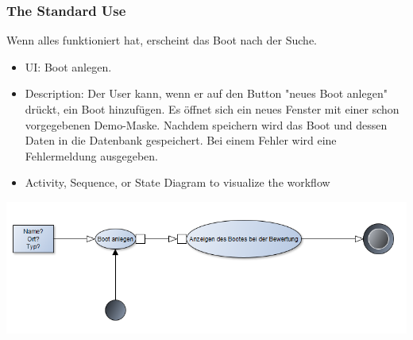 \documentclass[12pt]{article}
\theoremstyle{definition}
\begin{document}
\subsubsection{The Standard Use}
Wenn alles funktioniert hat, erscheint das Boot nach der Suche.
\begin{itemize}
	\item UI: Boot anlegen.
	\item Description: Der User kann, wenn er auf den Button "neues Boot anlegen" drückt, ein Boot hinzufügen. Es öffnet sich ein neues Fenster mit einer schon vorgegebenen Demo-Maske. 
	Nachdem speichern wird das Boot und dessen Daten in die Datenbank gespeichert. Bei einem Fehler wird eine Fehlermeldung ausgegeben.
	\item Activity, Sequence, or State Diagram to visualize the workflow
\end{itemize}
\includegraphics[height=0.40\textwidth]{Boot_anlegen.PNG}
\end{document}
